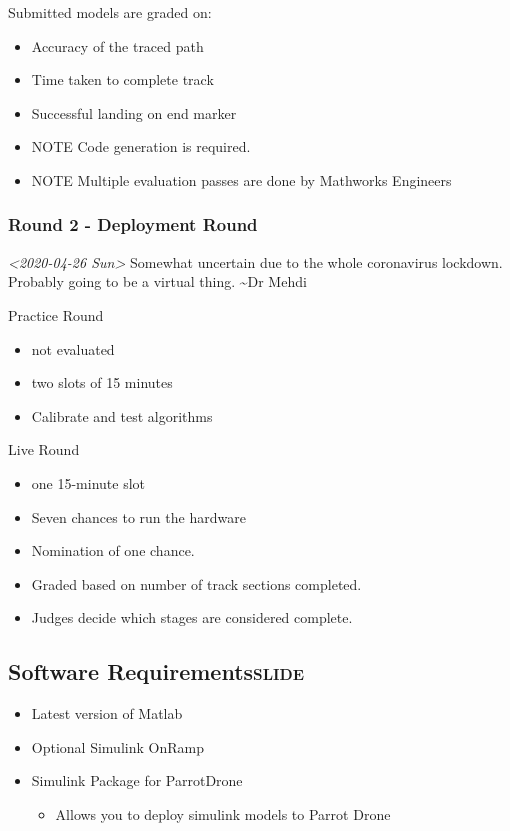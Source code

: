 \documentclass[11pt]{article}
\begin{document}
Submitted models are graded on:
\begin{itemize}
\item Accuracy of the traced path
\item Time taken to complete track
\item Successful landing on end marker
\item NOTE Code generation is required.
\item NOTE Multiple evaluation passes are done by Mathworks Engineers
\end{itemize}

\subsubsection{Round 2 - Deployment Round}
\label{sec:orgd4063c9}
\textit{<2020-04-26 Sun>}
Somewhat uncertain due to the whole coronavirus lockdown.
Probably going to be a virtual thing. \textasciitilde{}Dr Mehdi

Practice Round
\begin{itemize}
\item not evaluated
\item two slots of 15 minutes
\item Calibrate and test algorithms
\end{itemize}

Live Round
\begin{itemize}
\item one 15-minute slot
\item Seven chances to run the hardware
\item Nomination of one chance.
\item Graded based on number of track sections completed.
\item Judges decide which stages are considered complete.
\end{itemize}

\subsection{Software Requirements\hfill{}\textsc{slide}}
\label{sec:org0253270}
\begin{itemize}
\item Latest version of Matlab
\item Optional Simulink OnRamp
\item Simulink Package for ParrotDrone
\begin{itemize}
\item Allows you to deploy simulink models to Parrot Drone
\end{itemize}
\end{itemize}
\end{document}
